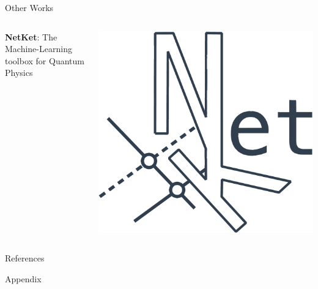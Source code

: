 \documentclass{beamer}
\begin{document}
\begin{frame}{Other Works}
\begin{columns}
\begin{column}{0.6\textwidth}
\textbf{NetKet}: The Machine-Learning toolbox for Quantum Physics
\end{column}
\begin{column}{0.3\textwidth}
\includegraphics[width=\textwidth]{images/netket.png}
\end{column}
\end{columns}
\end{frame}

\begin{frame}{References}

\end{frame}

\backmatter

\appendix


\begin{chapter}{}{Appendix}
\end{chapter}
\end{document}
